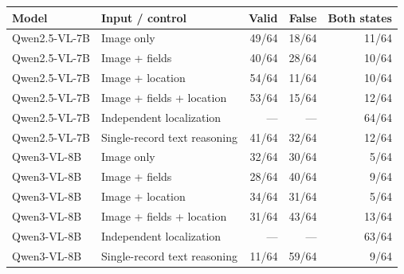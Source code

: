 \begin{tabular}{llrrr}
\toprule
Model & Input / control & Valid & False & Both states \\
\midrule
Qwen2.5-VL-7B & Image only & 49/64 & 18/64 & 11/64 \\
Qwen2.5-VL-7B & Image + fields & 40/64 & 28/64 & 10/64 \\
Qwen2.5-VL-7B & Image + location & 54/64 & 11/64 & 10/64 \\
Qwen2.5-VL-7B & Image + fields + location & 53/64 & 15/64 & 12/64 \\
Qwen2.5-VL-7B & Independent localization & --- & --- & 64/64 \\
Qwen2.5-VL-7B & Single-record text reasoning & 41/64 & 32/64 & 12/64 \\
Qwen3-VL-8B & Image only & 32/64 & 30/64 & 5/64 \\
Qwen3-VL-8B & Image + fields & 28/64 & 40/64 & 9/64 \\
Qwen3-VL-8B & Image + location & 34/64 & 31/64 & 5/64 \\
Qwen3-VL-8B & Image + fields + location & 31/64 & 43/64 & 13/64 \\
Qwen3-VL-8B & Independent localization & --- & --- & 63/64 \\
Qwen3-VL-8B & Single-record text reasoning & 11/64 & 59/64 & 9/64 \\
\bottomrule
\end{tabular}
